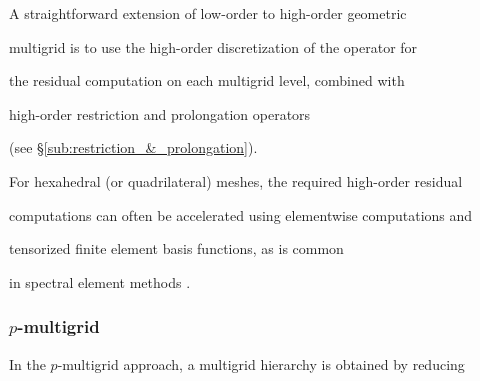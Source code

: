 \documentclass[smallcondensed,final]{svjour3}     %
\begin{document}
A straightforward extension of low-order to high-order geometric

multigrid is to use the high-order discretization of the operator for

the residual computation on each multigrid level, combined with

high-order restriction and prolongation operators

(see \S\ref{sub:restriction_&_prolongation}).








%






For hexahedral (or quadrilateral) meshes, the required high-order residual

computations can often be accelerated using elementwise computations and


tensorized finite element basis functions, as is common

in spectral element methods \cite{DevilleFischerMund02}.



\subsubsection{$p$-multigrid}\label{subsec:p}

In the $p$-multigrid approach, a multigrid hierarchy is obtained by reducing
\end{document}
